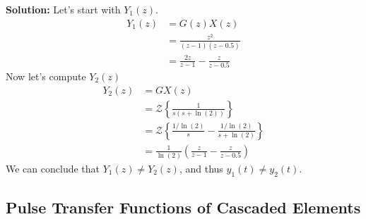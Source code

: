 \documentclass[twoside]{article}
\begin{document}
%
\textbf{Solution:} Let's start with $Y_1(z)$. 
%
\begin{align*}
Y_1(z) &= G(z) X(z) \\
        &= \frac{z^2}{(z-1)(z-0.5)} \\
&= \frac{2 z}{z-1} - \frac{z}{z-0.5}
\end{align*}
%
Now let's compute $Y_2(z)$
%
%
\begin{align*}
Y_2(z) &= GX(z) \\
        &= \mathcal{Z} \left\lbrace \frac{1}{s (s+\ln(2))} \right\rbrace \\
&= \mathcal{Z} \left\lbrace \frac{1/\ln(2)}{s} -
  \frac{1/\ln(2)}{s+\ln(2)} \right\rbrace
\\
&=  \frac{1}{\ln(2)} \left( \frac{z}{z-1} - \frac{z}{z-0.5} \right)
\end{align*}
%
We can conclude that $Y_1(z) \neq Y_2(z)$, and thus  $y_1(t) \neq y_2(t)$.

\subsection*{Pulse Transfer Functions of Cascaded Elements}
\end{document}
